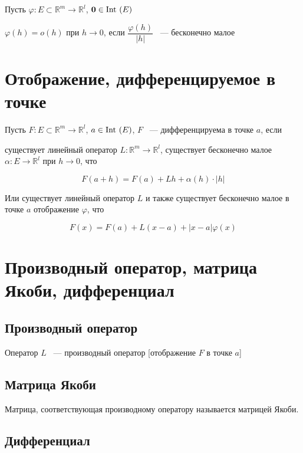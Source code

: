 \documentclass{article}
\begin{document}
        Пусть $\varphi : E \subset \mathbb{R}^m \rightarrow \mathbb{R}^l$, $\mathbf{0} \in \Int(E)$
        
        $\varphi(h) = o(h)$ при $h \rightarrow 0$, если $\dfrac{\varphi(h)}{| h |}$ ~--- бесконечно малое
        
    \newpage
    
    \section{Отображение, дифференцируемое в точке}
    
        Пусть $F : E \subset \mathbb{R}^m \rightarrow \mathbb{R}^l$, $a \in \Int(E)$, $F$ ~--- дифференцируема в точке $a$, если
        
        существует линейный оператор $L : \mathbb{R}^m \rightarrow \mathbb{R}^l$, существует бесконечно малое $\alpha : E \rightarrow \mathbb{R}^l$ при $h \rightarrow 0$, что
        
        $$F(a + h) = F(a) + Lh + \alpha(h) \cdot |h|$$
        
        Или существует линейный оператор $L$ и также существует бесконечно малое в точке $a$ отображение $\varphi$, что
        
        $$F(x) = F(a) + L(x - a) + | x - a| \varphi(x)$$
        
    \newpage
    
    \section{Производный оператор, матрица Якоби, дифференциал}
    
        \subsection{Производный оператор}
        
            Оператор $L$ ~--- производный оператор [отображение $F$ в точке $a$]
            
        \subsection{Матрица Якоби}
        
            Матрица, соответствующая производному оператору называется матрицей Якоби.
            
        \subsection{Дифференциал}
        
\end{document}
